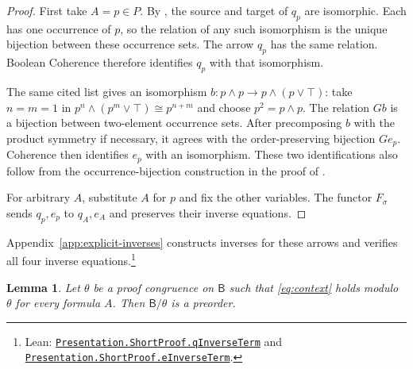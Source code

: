 \documentclass[11pt]{article}
\newtheorem{lemma}[theorem]{Lemma}
\newcommand{\B}{\mathsf B}
\begin{document}
\begin{proof}
First take $A=p\in P$. By \cite[\S12.5, p.~294]{DP}, the source
and target of $q_p$ are isomorphic. Each has one occurrence of $p$,
so the relation of any such isomorphism is the unique bijection
between these occurrence sets. The arrow $q_p$ has the same relation.
Boolean Coherence therefore identifies $q_p$ with that isomorphism.

The same cited list gives an isomorphism
$b:p\wedge p\to p\wedge(p\vee\top)$: take $n=m=1$ in
$p^n\wedge(p^m\vee\top)\cong p^{n+m}$ and choose $p^2=p\wedge p$.
The relation $Gb$ is a bijection between two-element occurrence sets.
After precomposing $b$ with the product symmetry if necessary, it
agrees with the order-preserving bijection $Ge_p$. Coherence then
identifies $e_p$ with an isomorphism. These two identifications also
follow from the occurrence-bijection construction in the proof of
\cite[Lemma~7]{DPIsomorphic}.

For arbitrary $A$, substitute $A$ for $p$ and fix the other variables.
The functor $F_\sigma$ sends $q_p,e_p$ to $q_A,e_A$ and preserves
their inverse equations.
\end{proof}

Appendix~\ref{app:explicit-inverses} constructs inverses for
these arrows and verifies all four inverse equations.\footnote{\raggedright Lean:
\href{https://github.com/flengyel/Dosen-Petric-Maximality/blob/5dbee39bea09539bd130f729e82636419f71f920/DosenPetric/PresentationShortQ.lean\#L17}{\texttt{Presentation.ShortProof.\allowbreak{}qInverseTerm}} and
\href{https://github.com/flengyel/Dosen-Petric-Maximality/blob/5dbee39bea09539bd130f729e82636419f71f920/DosenPetric/PresentationShortE.lean\#L30}{\texttt{Presentation.ShortProof.\allowbreak{}eInverseTerm}}.}

\begin{lemma}\label{lem:collapse}
Let $\theta$ be a proof congruence on $\B$ such that
\eqref{eq:context} holds modulo $\theta$ for every formula $A$.
Then $\B/\theta$ is a preorder.
\end{lemma}
\end{document}
